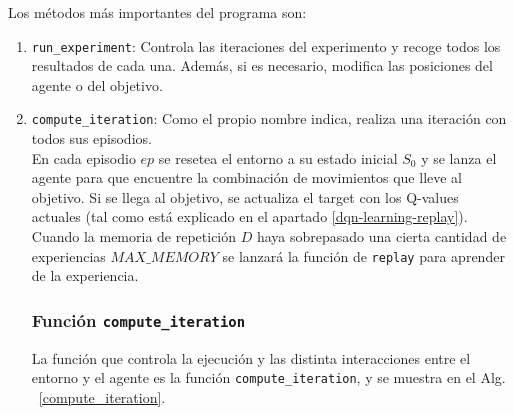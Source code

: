 Los métodos más importantes del programa son: 

\begin{enumerate}
    \item \texttt{run\_experiment}: Controla las iteraciones del experimento y recoge todos los resultados de cada una. Además, si es necesario, modifica las posiciones del agente o del objetivo. 
    \item \texttt{compute\_iteration}: Como el propio nombre indica, realiza una iteración con todos sus episodios. \\
    
    En cada episodio $ep$ se resetea el entorno a su estado inicial $S_0$ y se lanza el agente para que encuentre la combinación de movimientos que lleve al objetivo. Si se llega al objetivo, se actualiza el target con los Q-values actuales (tal como está explicado en el apartado \ref{dqn-learning-replay}). Cuando la memoria de repetición $D$ haya sobrepasado una cierta cantidad de experiencias $MAX\_MEMORY$ se lanzará la función de \texttt{replay} para aprender de la experiencia. \\

\subsubsection{Función \texttt{compute\_iteration}}

La función que controla la ejecución y las distinta interacciones entre el entorno y el agente es la función \texttt{compute\_iteration}, y se muestra en el Alg. ~\ref{compute_iteration}. \\


\end{enumerate}
